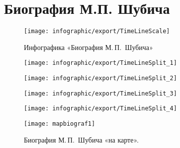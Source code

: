 ﻿\section{Биография М.П. Шубича}

\begin{figure}[H]
\texttt{[image: infographic/export/TimeLineScale]}
\caption{Инфографика «Биография М.\,П.~Шубича»}
\label{fig:TimeLineScale}
\end{figure}

\clearpage


\begin{figure}[H]
\texttt{[image: infographic/export/TimeLineSplit\_1]}
\label{fig:TimeLineSplit_1}
\end{figure}

\clearpage

\begin{figure}[t]
\texttt{[image: infographic/export/TimeLineSplit\_2]}
\label{fig:TimeLineSplit_2}
\end{figure}

\clearpage

\begin{figure}[t]
\texttt{[image: infographic/export/TimeLineSplit\_3]}
\label{fig:TimeLineSplit_3}
\end{figure}

\clearpage

\begin{figure}[t]
\texttt{[image: infographic/export/TimeLineSplit\_4]}
\label{fig:TimeLineSplit_4}
\end{figure}

\clearpage 

\begin{figure}[h]
\texttt{[image: mapbiograf1]}
\caption{Биография М.\,П.~Шубича «на карте».}
\label{fig:mapbiograf1}
\end{figure}

